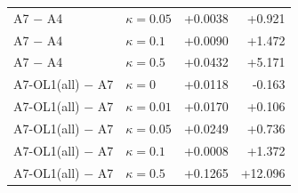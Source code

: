 \begin{table}[p]
\begin{tabular}{@{}llrr@{}}
A7 $-$ A4 & $\kappa=0.05$ & +0.0038 & +0.921 \\
A7 $-$ A4 & $\kappa=0.1$ & +0.0090 & +1.472 \\
A7 $-$ A4 & $\kappa=0.5$ & +0.0432 & +5.171 \\
A7-OL1(all) $-$ A7 & $\kappa=0$ & +0.0118 & -0.163 \\
A7-OL1(all) $-$ A7 & $\kappa=0.01$ & +0.0170 & +0.106 \\
A7-OL1(all) $-$ A7 & $\kappa=0.05$ & +0.0249 & +0.736 \\
A7-OL1(all) $-$ A7 & $\kappa=0.1$ & +0.0008 & +1.372 \\
A7-OL1(all) $-$ A7 & $\kappa=0.5$ & +0.1265 & +12.096 \\
\bottomrule
\end{tabular}
\end{table}
